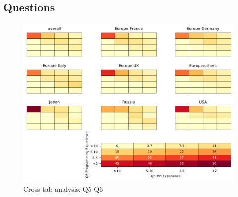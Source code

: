 
\subsection{Questions}


\begin{figure}
\begin{center}
\includegraphics[width=12cm]{../pdfs/Q5-Q6.pdf}
\caption{Cross-tab analysis: Q5-Q6}
\label{fig:Q5-Q6}
\end{center}
\end{figure}
